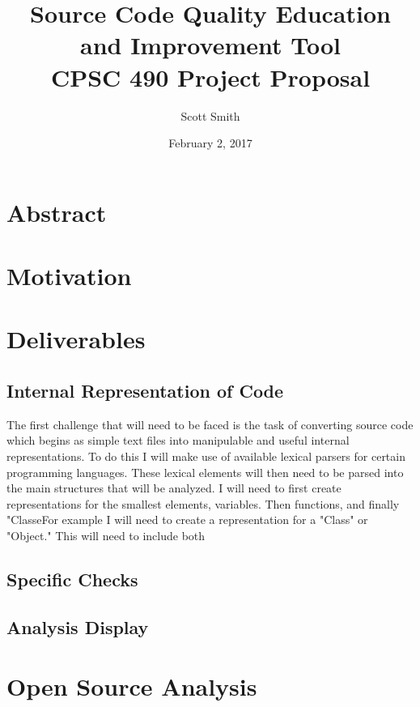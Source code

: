 \documentclass{article}
\title{%
	Source Code Quality Education and Improvement Tool \\
	\large CPSC 490 Project Proposal}
\date{February 2, 2017}
\author{Scott Smith}
\begin{document}
\maketitle
\newpage

\section*{Abstract}

\section*{Motivation}

\section*{Deliverables}
\subsection*{Internal Representation of Code}
The first challenge that will need to be faced is the task of converting source code which begins as simple text files into manipulable and useful internal representations. To do this I will make use of available lexical parsers for certain programming languages. These lexical elements will then need to be parsed into the main structures that will be analyzed. I will need to first create representations for the smallest elements, variables. Then functions, and finally "ClasseFor example I will need to create a representation for a "Class" or "Object." This will need to include both 
\subsection*{Specific Checks}
\subsection*{Analysis Display}

\section*{Open Source Analysis}
	
\end{document}
